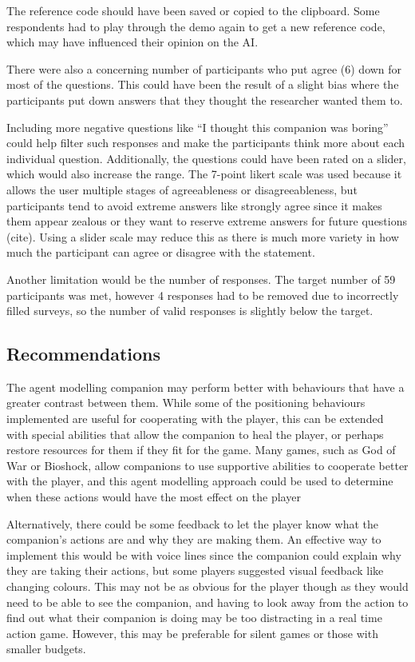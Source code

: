 \documentclass{IEEEtran}
\begin{document}
The reference code should have been saved or copied to the clipboard. Some respondents had to play through the demo again to get a new reference code, which may have influenced their opinion on the AI.

There were also a concerning number of participants who put agree (6) down for most of the questions. This could have been the result of a slight bias where the participants put down answers that they thought the researcher wanted them to.


Including more negative questions like “I thought this companion was boring” could help filter such responses and make the participants think more about each individual question. Additionally, the questions could have been rated on a slider, which would also increase the range. The 7-point likert scale was used because it allows the user multiple stages of agreeableness or disagreeableness, but participants tend to avoid extreme answers like strongly agree since it makes them appear zealous or they want to reserve extreme answers for future questions (cite). Using a slider scale may reduce this as there is much more variety in how much the participant can agree or disagree with the statement.

Another limitation would be the number of responses. The target number of 59 participants was met, however 4 responses had to be removed due to incorrectly filled surveys, so the number of valid responses is slightly below the target.

\subsection{Recommendations}
\label{Recommendations}

The agent modelling companion may perform better with behaviours that have a greater contrast between them. While some of the positioning behaviours implemented are useful for cooperating with the player, this can be extended with special abilities that allow the companion to heal the player, or perhaps restore resources for them if they fit for the game. Many games, such as God of War or Bioshock, allow companions to use supportive abilities to cooperate better with the player, and this agent modelling approach could be used to determine when these actions would have the most effect on the player \cite{AIGamesBioshockAI, GDCAtreus}

Alternatively, there could be some feedback to let the player know what the companion’s actions are and why they are making them. An effective way to implement this would be with voice lines since the companion could explain why they are taking their actions, but some players suggested visual feedback like changing colours. This may not be as obvious for the player though as they would need to be able to see the companion, and having to look away from the action to find out what their companion is doing may be too distracting in a real time action game. However, this may be preferable for silent games or those with smaller budgets.
\end{document}

